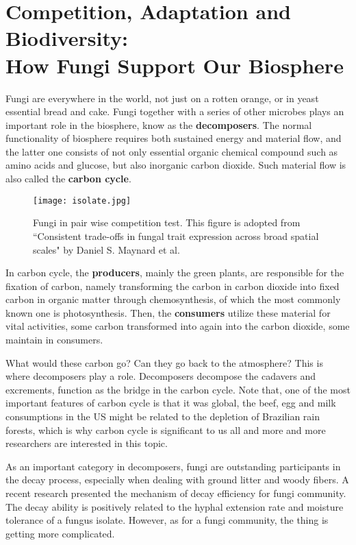 \section*{Competition, Adaptation and Biodiversity:\\How Fungi Support Our Biosphere}

\setcounter{figure}{0}

Fungi are everywhere in the world, not just on a rotten orange, or in yeast essential bread and cake. Fungi together with a series of other microbes plays an important role in the biosphere, know as the \textbf{decomposers}. The normal functionality of biosphere requires both sustained energy and material flow, and the latter one consists of not only essential organic chemical compound such as amino acids and glucose, but also inorganic carbon dioxide. Such material flow is also called the \textbf{carbon cycle}.

\begin{figure}[ht]
    \centering
    \texttt{[image: isolate.jpg]}
    \caption{Fungi in pair wise competition test. This figure is adopted from ``Consistent trade-offs in fungal trait expression across broad spatial scales" by Daniel S. Maynard et al.}
    \label{fig:decom-hyphal-122d}
\end{figure}

In carbon cycle, the \textbf{producers}, mainly the green plants, are responsible for the fixation of carbon, namely transforming the carbon in carbon dioxide into fixed carbon in organic matter through chemosynthesis, of which the most commonly known one is photosynthesis. Then, the \textbf{consumers} utilize these material for vital activities, some carbon transformed into again into the carbon dioxide, some maintain in consumers.

What would these carbon go? Can they go back to the atmosphere? This is where decomposers play a role. Decomposers decompose the cadavers and excrements, function as the bridge in the carbon cycle. Note that, one of the most important features of carbon cycle is that it was global, the beef, egg and milk consumptions in the US might be related to the depletion of Brazilian rain forests, which is why carbon cycle is significant to us all and more and more researchers are interested in this topic.

As an important category in decomposers, fungi are outstanding participants in the decay process, especially when dealing with ground litter and woody fibers. A recent research presented the mechanism of decay efficiency for fungi community. The decay ability is positively related to the hyphal extension rate and moisture tolerance of a fungus isolate. However, as for a fungi community, the thing is getting more complicated.

